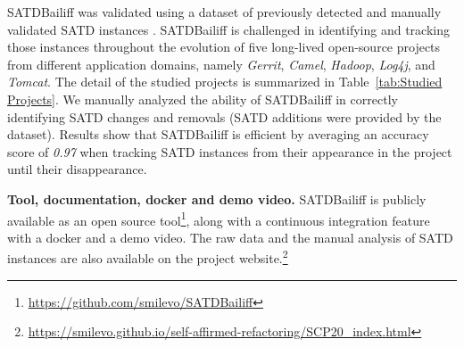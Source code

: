 \documentclass[3p]{elsarticle}
\newcommand{\approach}{SATDBailiff\xspace}
\begin{document}



\approach was validated using a dataset of previously detected and manually validated SATD instances \cite{Maldonado2017-1}. \approach is challenged in identifying and tracking those instances throughout the evolution of five long-lived open-source projects from different application domains, namely \textit{Gerrit}, \textit{Camel}, \textit{Hadoop}, \textit{Log4j}, and \textit{Tomcat}. The detail of the studied projects is summarized in Table~\ref{tab:Studied Projects}. We manually analyzed the ability of \approach in correctly identifying SATD changes and removals (SATD additions were provided by the dataset). Results show that \approach is efficient by averaging an accuracy score of \textit{0.97}  when tracking SATD instances from their appearance in the project until their disappearance.


\textbf{Tool, documentation, docker and demo video.} \approach is publicly available as an open source tool\footnote{\url{https://github.com/smilevo/SATDBailiff}}, along with a continuous integration feature with a docker and a demo video. The raw data and the manual analysis of SATD instances are also available on the project website.\footnote{\url{https://smilevo.github.io/self-affirmed-refactoring/SCP20_index.html}}
\end{document}
